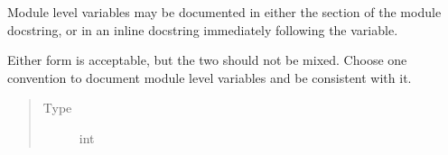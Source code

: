 \documentclass[letterpaper,10pt,english]{sphinxmanual}
\begin{document}
\begin{fulllineitems}
\label{\detokenize{source/example:example.module_level_variable1}}
\pysigstartsignatures
{}
\pysigstopsignatures
\sphinxAtStartPar
Module level variables may be documented in
either the  section of the module docstring, or in an
inline docstring immediately following the variable.

\sphinxAtStartPar
Either form is acceptable, but the two should not be mixed. Choose
one convention to document module level variables and be consistent
with it.
\begin{quote}\begin{description}
\item[{Type}] \leavevmode
\sphinxAtStartPar
int

\end{description}\end{quote}

\end{fulllineitems}

\end{document}
